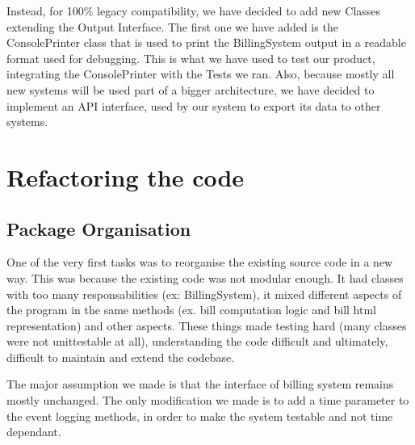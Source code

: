 \documentclass[11pt,twocolumn]{article} %
\begin{document}
Instead, for 100\% legacy compatibility, we have decided to add new Classes extending the Output Interface. 
The first one we have added is the ConsolePrinter class that is used to print the BillingSystem output in a readable format used for debugging.
This is what we have used to test our product, integrating the ConsolePrinter with the Tests we ran. Also, because mostly all new systems will be used 
part of a bigger architecture, we have decided to implement an API interface, used by our system to export its data to other systems. 

\section{Refactoring the code}

\subsection{Package Organisation}
One of the very first tasks was to reorganise the existing source code in a new way.
This was because the existing code was not modular enough. It had classes with too many responsabilities (ex: BillingSystem),
it mixed different aspects of the program in the same methods (ex. bill computation logic and bill html representation) and other aspects.
These things made testing hard (many classes were not unittestable at all), understanding the code difficult and ultimately,
difficult to maintain and extend the codebase.

The major assumption we made is that the interface of billing system remains mostly unchanged. The only modification we made is to add 
a time parameter to the event logging methods, in order to make the system testable and not time dependant.
\end{document}
